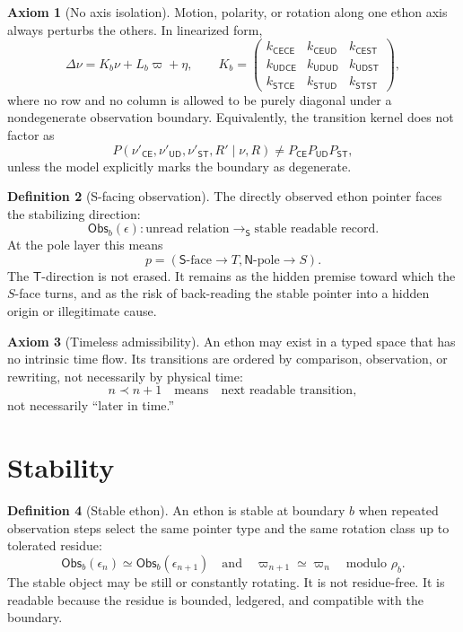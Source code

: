 \documentclass[11pt]{article}
\theoremstyle{definition}
\newtheorem{definition}{Definition}[section]
\newtheorem{axiom}[definition]{Axiom}
\theoremstyle{plain}
\newcommand{\Obs}{\mathsf{Obs}}
\newcommand{\Sdir}{\mathsf S}
\newcommand{\Tdir}{\mathsf T}
\newcommand{\CE}{\mathsf{CE}}
\newcommand{\UD}{\mathsf{UD}}
\newcommand{\ST}{\mathsf{ST}}
\newcommand{\Npole}{\mathsf N}
\newcommand{\Spole}{\mathsf S}
\begin{document}
\begin{axiom}[No axis isolation]
Motion, polarity, or rotation along one ethon axis always perturbs the
others.  In linearized form,
\[
  \Delta\nu
  =
  K_b\nu+L_b\varpi+\eta,
  \qquad
  K_b=
  \begin{pmatrix}
    k_{\CE\CE} & k_{\CE\UD} & k_{\CE\ST}\\
    k_{\UD\CE} & k_{\UD\UD} & k_{\UD\ST}\\
    k_{\ST\CE} & k_{\ST\UD} & k_{\ST\ST}
  \end{pmatrix},
\]
where no row and no column is allowed to be purely diagonal under a
nondegenerate observation boundary.  Equivalently, the transition kernel
does not factor as
\[
  P(\nu'_{\CE},\nu'_{\UD},\nu'_{\ST},R'\mid\nu,R)
  \neq
  P_{\CE}P_{\UD}P_{\ST},
\]
unless the model explicitly marks the boundary as degenerate.
\end{axiom}

\begin{definition}[S-facing observation]
The directly observed ethon pointer faces the stabilizing direction:
\[
  \Obs_b(\epsilon):
  \text{unread relation}
  \longrightarrow_{\Sdir}
  \text{stable readable record}.
\]
At the pole layer this means
\[
  p=(\Spole\text{-face}\to T,\Npole\text{-pole}\to S).
\]
The \(\Tdir\)-direction is not erased.  It remains as the hidden premise
toward which the \(S\)-face turns, and as the risk of back-reading the
stable pointer into a hidden origin or illegitimate cause.
\end{definition}

\begin{axiom}[Timeless admissibility]
An ethon may exist in a typed space that has no intrinsic time flow.
Its transitions are ordered by comparison, observation, or rewriting,
not necessarily by physical time:
\[
  n\prec n+1
  \quad\text{means}\quad
  \text{next readable transition},
\]
not necessarily ``later in time.''
\end{axiom}

\section{Stability}

\begin{definition}[Stable ethon]
An ethon is stable at boundary \(b\) when repeated observation steps
select the same pointer type and the same rotation class up to tolerated
residue:
\[
  \Obs_b(\epsilon_n)
  \simeq
  \Obs_b(\epsilon_{n+1})
  \quad
  \text{and}
  \quad
  \varpi_{n+1}\simeq\varpi_n
  \quad
  \text{modulo }\rho_b.
\]
The stable object may be still or constantly rotating.  It is not
residue-free.  It is readable because the residue is bounded, ledgered,
and compatible with the boundary.
\end{definition}
\end{document}
